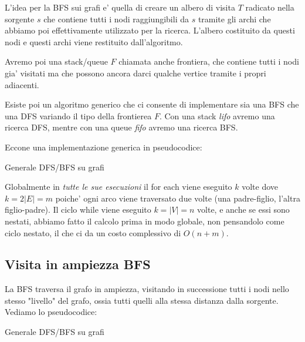\documentclass{article}
\begin{document}
L'idea per la BFS sui grafi e' quella di creare un albero di visita $T$ radicato
nella sorgente $s$ che contiene tutti i nodi raggiungibili da $s$ tramite gli
archi che abbiamo poi effettivamente utilizzato per la ricerca. L'albero costituito
da questi nodi e questi archi viene restituito dall'algoritmo.

Avremo poi una stack/queue $F$ chiamata anche frontiera, che contiene tutti i
nodi gia' visitati ma che possono ancora darci qualche vertice tramite i propri
adiacenti.

Esiste poi un algoritmo generico che ci consente di implementare sia una BFS che
una DFS variando il tipo della frontierea $F$. Con una stack \emph{lifo} avremo una
ricerca DFS, mentre con una queue \emph{fifo} avremo una ricerca BFS.

Eccone una implementazione generica in pseudocodice:

\begin{algorithm}[H]
  \caption{Generale DFS/BFS su grafi}
\end{algorithm}

Globalmente in \emph{tutte le sue esecuzioni} il for each viene eseguito $k$
volte dove $k = 2 |E| = m$ poiche' ogni arco viene traversato due volte (una padre-figlio,
l'altra figlio-padre). Il ciclo while viene eseguito $k = |V| = n$ volte, e anche
se essi sono nestati, abbiamo fatto il calcolo prima in modo globale, non pensandolo
come ciclo nestato, il che ci da un costo complessivo di $O(n + m)$.

\subsection{Visita in ampiezza BFS}

La BFS traversa il grafo in ampiezza, visitando in successione tutti i nodi nello
stesso "livello" del grafo, ossia tutti quelli alla stessa distanza dalla sorgente.
Vediamo lo pseudocodice:

\begin{algorithm}[H]
  \caption{Generale DFS/BFS su grafi}
\end{algorithm}
\end{document}
